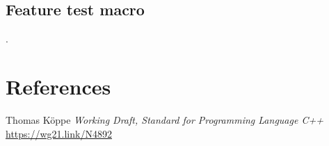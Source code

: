\documentclass{wg21}
\begin{document}
\subsection{Feature test macro}

.

\section{References}

\renewcommand{\section}[2]{}%



\begin{thebibliography}{9}

Thomas Köppe
\emph{Working Draft, Standard for Programming Language C++}\newline
\url{https://wg21.link/N4892}


\end{thebibliography}
\end{document}
